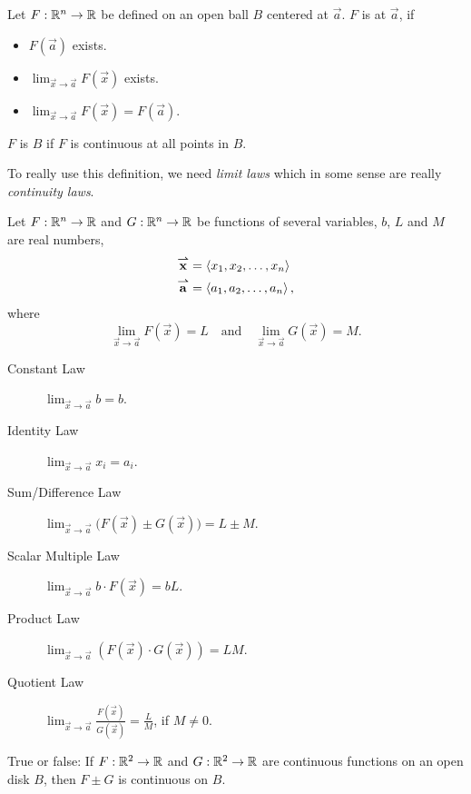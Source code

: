 \documentclass{ximera}
\begin{document}
\begin{definition}
  Let $F:\mathbb R^n\to \mathbb R$ be defined on an open ball $B$ centered at
  $\vec{a}$. $F$ is  at $\vec{a}$, if
  \begin{itemize}
  \item $F(\vec{a})$ exists.
  \item $\lim_{\vec{x}\to\vec{a}} F(\vec{x})$ exists.
  \item $\lim_{\vec{x}\to\vec{a}} F(\vec{x}) = F(\vec{a}).$
  \end{itemize}
  $F$ is  $B$ if $F$ is continuous at
  all points in $B$.
\end{definition}

To really use this definition, we need \textit{limit laws} which in
some sense are really \textit{continuity laws}.

\begin{theorem}
  Let $F:\mathbb R^n\to \mathbb R$ and $G:\mathbb R^n\to \mathbb R$ be functions of several
  variables, $b$, $L$ and $M$ are real numbers,
  \begin{align*}
    {\overset{\boldsymbol{\rightharpoonup}}{\mathbf{x}}}\hspace{0in} &= \left\langle x_1,x_2,\dots,x_n\right\rangle\\ {\overset{\boldsymbol{\rightharpoonup}}{\mathbf{a}}}\hspace{0in} &=
    \left\langle a_1,a_2,\dots,a_n\right\rangle,
  \end{align*}
  where
  \[
  \lim_{\vec{x}\to\vec{a}}F(\vec{x}) = L \quad \text{and}\quad \lim_{\vec{x}\to\vec{a}} G(\vec{x}) = M.
  \]
\begin{description}
\item[Constant Law] $\lim_{\vec{x}\to \vec{a}} b = b$.
\item[Identity Law] $\lim_{\vec{x}\to \vec{a}} x_i = a_i$.
\item[Sum/Difference Law] $\lim_{\vec{x}\to \vec{a}}\big(F(\vec{x})\pm G(\vec{x})\big) = L\pm M$.
\item[Scalar Multiple Law] $\lim_{\vec{x}\to \vec{a}} b\cdot F(\vec{x}) = bL$.
\item[Product Law] $\lim_{\vec{x}\to \vec{a}} \left(F(\vec{x})\cdot G(\vec{x})\right) = LM$.
\item[Quotient Law] $\lim_{\vec{x}\to \vec{a}} \frac{F(\vec{x})}{G(\vec{x})} = \frac{L}{M}$, if $M\neq 0$.
\end{description}
\end{theorem}

\begin{question}
  True or false: If $F:\mathbb R^2\to\mathbb R$ and $G:\mathbb R^2\to\mathbb R$ are continuous
  functions on an open disk $B$, then $F\pm G$ is continuous on $B$.
  \begin{prompt}
    \begin{multipleChoice}
  \end{multipleChoice}
  \end{prompt}
\end{question}
\end{document}
